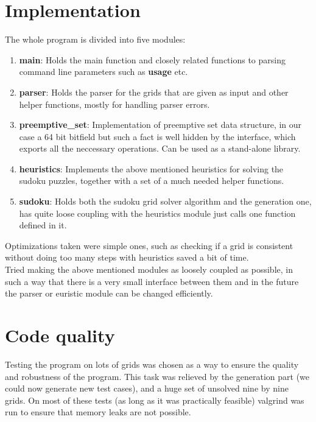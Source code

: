 \documentclass[english,a4paper]{article}
\begin{document}
\section{Implementation}

The whole program is divided into five modules: 
\begin{enumerate}
\item \textbf{main}: Holds the main function and closely related
  functions to parsing command line parameters such as \textbf{usage}
  etc.
\item \textbf{parser}: Holds the parser for the grids that are given
  as input and other helper functions, mostly for handling parser
  errors.
\item \textbf{preemptive\_set}: Implementation of preemptive set data
  structure, in our case a 64 bit bitfield but such a fact is well
  hidden by the interface, which exports all the neccessary operations.
  Can be used as a stand-alone library.
\item \textbf{heuristics}: Implements the above mentioned heuristics
  for solving the sudoku puzzles, together with a set of a much needed
  helper functions.
\item \textbf{sudoku}: Holds both the sudoku grid solver algorithm and
  the generation one, has quite loose coupling with the heuristics
  module just calls one function defined in it. 
\end{enumerate}

Optimizations taken were simple ones, such as checking if a grid is
consistent without doing too many steps with heuristics saved a bit of
time.\\ 

Tried making the above mentioned modules as loosely coupled as
possible, in such a way that there is a very small interface between
them and in the future the parser or euristic module can be changed
efficiently.

\section{Code quality}

Testing the program on lots of grids was chosen as a way to ensure the
quality and robustness of the program. This task was relieved by the
generation part (we could now generate new test cases), and a huge set
of unsolved nine by nine grids. On most of these tests (as long as it
was practically feasible) valgrind was run to ensure that memory leaks
are not possible.\\
\end{document}
